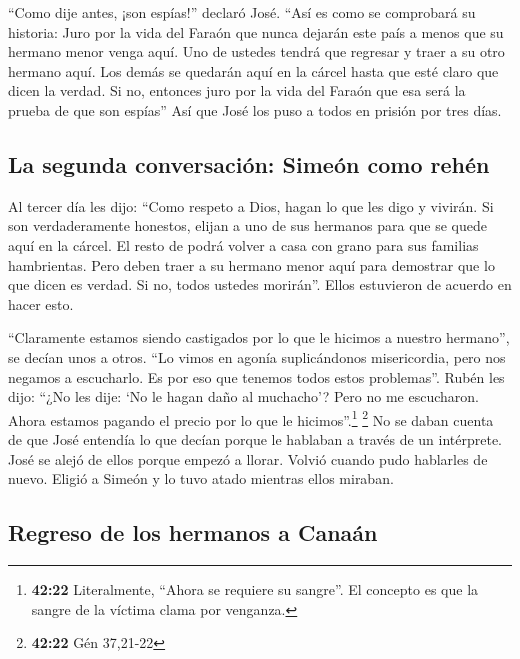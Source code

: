  ``Como dije antes, ¡son espías!'' declaró José.
 ``Así es como se comprobará su historia: Juro por la
vida del Faraón que nunca dejarán este país a menos que su hermano menor
venga aquí.  Uno de ustedes tendrá que regresar y traer a
su otro hermano aquí. Los demás se quedarán aquí en la cárcel hasta que
esté claro que dicen la verdad. Si no, entonces juro por la vida del
Faraón que esa será la prueba de que son espías''  Así
que José los puso a todos en prisión por tres días.

\hypertarget{la-segunda-conversaciuxf3n-simeuxf3n-como-rehuxe9n}{%
\subsection{La segunda conversación: Simeón como
rehén}\label{la-segunda-conversaciuxf3n-simeuxf3n-como-rehuxe9n}}

 Al tercer día les dijo: ``Como respeto a Dios, hagan lo
que les digo y vivirán.  Si son verdaderamente honestos,
elijan a uno de sus hermanos para que se quede aquí en la cárcel. El
resto de podrá volver a casa con grano para sus familias hambrientas.
 Pero deben traer a su hermano menor aquí para demostrar
que lo que dicen es verdad. Si no, todos ustedes morirán''. Ellos
estuvieron de acuerdo en hacer esto.

 ``Claramente estamos siendo castigados por lo que le
hicimos a nuestro hermano'', se decían unos a otros. ``Lo vimos en
agonía suplicándonos misericordia, pero nos negamos a escucharlo. Es por
eso que tenemos todos estos problemas''.  Rubén les dijo:
``¿No les dije: `No le hagan daño al muchacho'? Pero no me escucharon.
Ahora estamos pagando el precio por lo que le hicimos''.\footnote{\textbf{42:22}
  Literalmente, ``Ahora se requiere su sangre''. El concepto es que la
  sangre de la víctima clama por venganza.} \footnote{\textbf{42:22} Gén
  37,21-22}  No se daban cuenta de que José entendía lo
que decían porque le hablaban a través de un intérprete. 
José se alejó de ellos porque empezó a llorar. Volvió cuando pudo
hablarles de nuevo. Eligió a Simeón y lo tuvo atado mientras ellos
miraban.

\hypertarget{regreso-de-los-hermanos-a-canauxe1n}{%
\subsection{Regreso de los hermanos a
Canaán}\label{regreso-de-los-hermanos-a-canauxe1n}}

